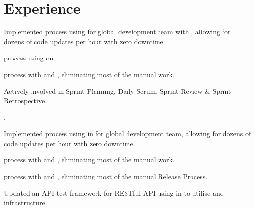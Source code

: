 \documentclass[]{resume-dark}
\begin{document}
\begin{minipage}[t]{0.66\textwidth} 


\section{Experience}
\begin{tightemize}
\item Implemented  process using  for global development team with , allowing for dozens of code updates per hour with zero downtime.
\item {} process using  on .
\item {} process with  and , eliminating most of the manual work.
\item Actively involved in Sprint Planning, Daily Scrum, Sprint Review \& Sprint Retrospective.
\item {}.
\end{tightemize}
\sectionsep
{}
\begin{tightemize}
\item Implemented  process using  in  for global development team, allowing for dozens of code updates per hour with zero downtime.
\item {} process with  and , eliminating most of the manual work.
\item {} process with  and , eliminating most of the manual Release Process.
\item Updated an API test framework for RESTful API using  in  to utilise  and  infrastructure.

\end{tightemize}
\end{minipage}
\end{document}
